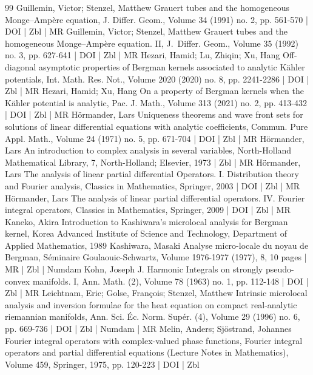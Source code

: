 \begin{thebibliography}{99}
Guillemin, Victor; Stenzel, Matthew Grauert tubes and the homogeneous Monge–Ampère equation, J. Differ. Geom., Volume 34 (1991) no. 2, pp. 561-570 | DOI | Zbl | MR
Guillemin, Victor; Stenzel, Matthew Grauert tubes and the homogeneous Monge–Ampère equation. II, J. Differ. Geom., Volume 35 (1992) no. 3, pp. 627-641 | DOI | Zbl | MR
Hezari, Hamid; Lu, Zhiqin; Xu, Hang Off-diagonal asymptotic properties of Bergman kernels associated to analytic Kähler potentials, Int. Math. Res. Not., Volume 2020 (2020) no. 8, pp. 2241-2286 | DOI | Zbl | MR
Hezari, Hamid; Xu, Hang On a property of Bergman kernels when the Kähler potential is analytic, Pac. J. Math., Volume 313 (2021) no. 2, pp. 413-432 | DOI | Zbl | MR
Hörmander, Lars Uniqueness theorems and wave front sets for solutions of linear differential equations with analytic coefficients, Commun. Pure Appl. Math., Volume 24 (1971) no. 5, pp. 671-704 | DOI | Zbl | MR
Hörmander, Lars An introduction to complex analysis in several variables, North-Holland Mathematical Library, 7, North-Holland; Elsevier, 1973 | Zbl | MR
Hörmander, Lars The analysis of linear partial differential Operators. I. Distribution theory and Fourier analysis, Classics in Mathematics, Springer, 2003 | DOI | Zbl | MR
Hörmander, Lars The analysis of linear partial differential operators. IV. Fourier integral operators, Classics in Mathematics, Springer, 2009 | DOI | Zbl | MR
Kaneko, Akira Introduction to Kashiwara’s microlocal analysis for Bergman kernel, Korea Advanced Institute of Science and Technology, Department of Applied Mathematics, 1989
Kashiwara, Masaki Analyse micro-locale du noyau de Bergman, Séminaire Goulaouic-Schwartz, Volume 1976-1977 (1977), 8, 10 pages | MR | Zbl | Numdam
Kohn, Joseph J. Harmonic Integrals on strongly pseudo-convex manifolds. I, Ann. Math. (2), Volume 78 (1963) no. 1, pp. 112-148 | DOI | Zbl | MR
Leichtnam, Eric; Golse, François; Stenzel, Matthew Intrinsic microlocal analysis and inversion formulae for the heat equation on compact real-analytic riemannian manifolds, Ann. Sci. Éc. Norm. Supér. (4), Volume 29 (1996) no. 6, pp. 669-736 | DOI | Zbl | Numdam | MR
Melin, Anders; Sjöstrand, Johannes Fourier integral operators with complex-valued phase functions, Fourier integral operators and partial differential equations (Lecture Notes in Mathematics), Volume 459, Springer, 1975, pp. 120-223 | DOI | Zbl

\end{thebibliography}
